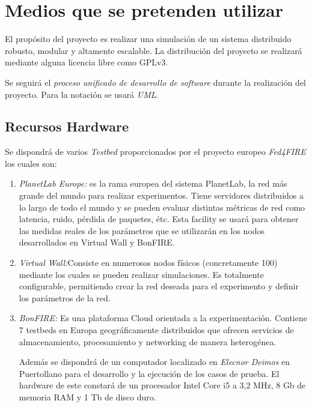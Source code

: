 
\section{Medios que se pretenden utilizar}
\label{sec:medios}

El propósito del proyecto es realizar una simulación de un sistema distribuido robusto, modular y altamente escalable.
La distribución del proyecto se realizará mediante alguna licencia libre como GPLv3\cite{GPLv3}.

Se seguirá el \emph{proceso unificado de desarrollo de software} durante la realización del proyecto.
Para la notación se usará \emph{UML}\cite{UML}.

\subsection{Recursos Hardware}
\label{sec:hardware}
Se dispondrá de varios \emph{Testbed} proporcionados por el proyecto europeo \emph{Fed4FIRE} los cuales son:
\begin{enumerate}
\item \emph{PlanetLab Europe\cite{PLE}:} es la rama europea del sistema PlanetLab, la red más grande del mundo para realizar experimentos. Tiene servidores distribuidos a lo largo de todo el mundo y se pueden evaluar distintas métricas de red como latencia, ruido, pérdida de paquetes, étc. Esta facility se usará para obtener las medidas reales de los parámetros que se utilizarán en los nodos desarrollados en Virtual Wall y BonFIRE.

\item \emph{Virtual Wall\cite{VW}:}Consiste en numerosos nodos físicos (concretamente 100) mediante los cuales se pueden realizar simulaciones. Es totalmente configurable, permitiendo crear la red deseada para el experimento y definir los parámetros de la red.
\item \emph{BonFIRE\cite{BF}:} Es una plataforma Cloud orientada a la experimentación. Contiene 7 testbeds en Europa geográficamente distribuidos que ofrecen servicios de almacenamiento, procesamiento y networking de manera heterogénea.

Además se dispondrá de un computador localizado en \emph{Elecnor Deimos} en Puertollano para el desarrollo y la ejecución de los casos de prueba. El hardware de este constará de un procesador Intel Core i5 a 3,2 MHz, 8 Gb de memoria RAM y 1 Tb de disco duro.

\end{enumerate}

